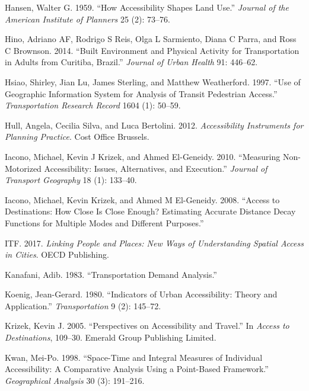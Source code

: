 \documentclass[preprint, 3p,
authoryear]{elsarticle} %
\newlength{\cslhangindent}
\newenvironment{CSLReferences}[2] %
 {\begin{list}{}{%
  \setlength{\itemindent}{0pt}
  \setlength{\leftmargin}{0pt}
  \setlength{\parsep}{0pt}
  \ifodd #1
   \setlength{\leftmargin}{\cslhangindent}
   \setlength{\itemindent}{-1\cslhangindent}
  \fi
  \setlength{\itemsep}{#2\baselineskip}}}
 {\end{list}}
\begin{document}
\begin{CSLReferences}{1}{0}
Hansen, Walter G. 1959. {``How Accessibility Shapes Land Use.''}
\emph{Journal of the American Institute of Planners} 25 (2): 73--76.

Hino, Adriano AF, Rodrigo S Reis, Olga L Sarmiento, Diana C Parra, and
Ross C Brownson. 2014. {``Built Environment and Physical Activity for
Transportation in Adults from Curitiba, Brazil.''} \emph{Journal of
Urban Health} 91: 446--62.

Hsiao, Shirley, Jian Lu, James Sterling, and Matthew Weatherford. 1997.
{``Use of Geographic Information System for Analysis of Transit
Pedestrian Access.''} \emph{Transportation Research Record} 1604 (1):
50--59.

Hull, Angela, Cecilia Silva, and Luca Bertolini. 2012.
\emph{Accessibility Instruments for Planning Practice}. Cost Office
Brussels.

Iacono, Michael, Kevin J Krizek, and Ahmed El-Geneidy. 2010.
{``Measuring Non-Motorized Accessibility: Issues, Alternatives, and
Execution.''} \emph{Journal of Transport Geography} 18 (1): 133--40.

Iacono, Michael, Kevin Krizek, and Ahmed M El-Geneidy. 2008. {``Access
to Destinations: How Close Is Close Enough? Estimating Accurate Distance
Decay Functions for Multiple Modes and Different Purposes.''}

ITF. 2017. \emph{Linking People and Places: New Ways of Understanding
Spatial Access in Cities}. OECD Publishing.

Kanafani, Adib. 1983. {``Transportation Demand Analysis.''}

Koenig, Jean-Gerard. 1980. {``Indicators of Urban Accessibility: Theory
and Application.''} \emph{Transportation} 9 (2): 145--72.

Krizek, Kevin J. 2005. {``Perspectives on Accessibility and Travel.''}
In \emph{Access to Destinations}, 109--30. Emerald Group Publishing
Limited.

Kwan, Mei-Po. 1998. {``Space-Time and Integral Measures of Individual
Accessibility: A Comparative Analysis Using a Point-Based Framework.''}
\emph{Geographical Analysis} 30 (3): 191--216.


\end{CSLReferences}
\end{document}
